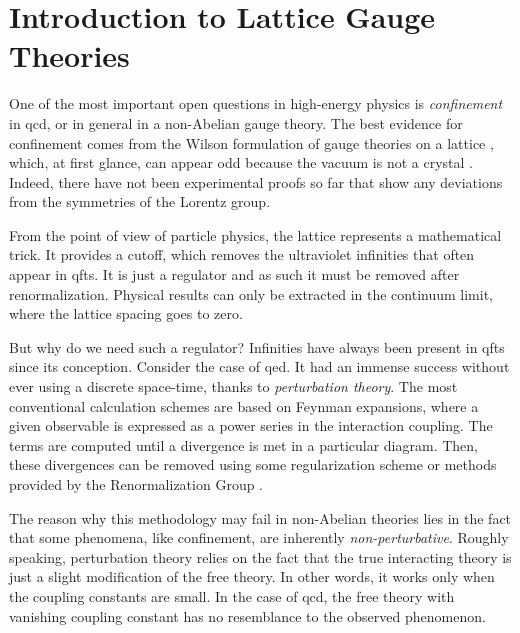 \chapter{Introduction to Lattice Gauge Theories}
\label{chap:introduction_to_lattice_gauge_theories}

One of the most important open questions in high-energy physics is \emph{confinement} in \ac{qcd},
or in general in a non-Abelian gauge theory.
The best evidence for confinement comes from the Wilson formulation of gauge theories on a lattice \cite{wilson1974confinement}, which, at first glance, can appear odd because the vacuum is not a crystal \cite{creutz1985book}.
Indeed, there have not been experimental proofs so far that show any deviations from the symmetries of the Lorentz group.

From the point of view of particle physics, the lattice represents a mathematical trick.
It provides a cutoff, which removes the ultraviolet infinities that often appear in \acp{qft}.
It is just a regulator and as such it must be removed after renormalization.
Physical results can only be extracted in the continuum limit, where the lattice spacing goes to zero.

But why do we need such a regulator?
Infinities have always been present in \acp{qft} since its conception.
Consider the case of \ac{qed}.
It had an immense success without ever using a discrete space-time, thanks to \emph{perturbation theory}.
The most conventional calculation schemes are based on Feynman expansions,
where a given observable is expressed as a power series in the interaction coupling.
The terms are computed until a divergence is met in a particular diagram.
Then, these divergences can be removed using some regularization scheme or methods provided by the Renormalization Group \cite{peskin1995qft}.

The reason why this methodology may fail in non-Abelian theories lies in the fact that some phenomena, like confinement, are inherently \emph{non-perturbative}.
Roughly speaking, perturbation theory relies on the fact that the true interacting theory is just a slight modification of the free theory.
In other words, it works only when the coupling constants are small.
In the case of \ac{qcd}, the free theory with vanishing coupling constant has no resemblance to the observed phenomenon.

